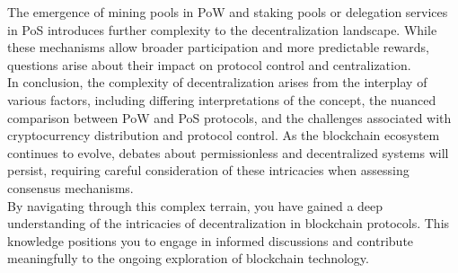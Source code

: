 The emergence of mining pools in PoW and staking pools or delegation services in PoS introduces further complexity to the decentralization landscape. While these mechanisms allow broader participation and more predictable rewards, questions arise about their impact on protocol control and centralization.\\
In conclusion, the complexity of decentralization arises from the interplay of various factors, including differing interpretations of the concept, the nuanced comparison between PoW and PoS protocols, and the challenges associated with cryptocurrency distribution and protocol control. As the blockchain ecosystem continues to evolve, debates about permissionless and decentralized systems will persist, requiring careful consideration of these intricacies when assessing consensus mechanisms.\\
By navigating through this complex terrain, you have gained a deep understanding of the intricacies of decentralization in blockchain protocols. This knowledge positions you to engage in informed discussions and contribute meaningfully to the ongoing exploration of blockchain technology.